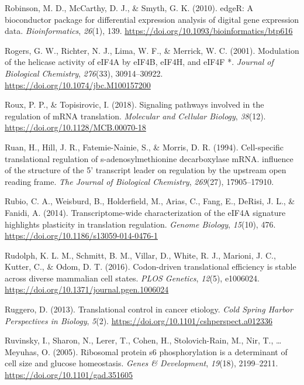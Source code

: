 \documentclass[12pt,openany]{book}
\begin{document}
\hypertarget{ref-Robinson2010}{}
Robinson, M. D., McCarthy, D. J., \& Smyth, G. K. (2010). edgeR: A
bioconductor package for differential expression analysis of digital
gene expression data. \emph{Bioinformatics}, \emph{26}(1), 139.
\url{https://doi.org/10.1093/bioinformatics/btp616}

\hypertarget{ref-Rogers2001}{}
Rogers, G. W., Richter, N. J., Lima, W. F., \& Merrick, W. C. (2001).
Modulation of the helicase activity of eIF4A by eIF4B, eIF4H, and eIF4F
*. \emph{Journal of Biological Chemistry}, \emph{276}(33), 30914--30922.
\url{https://doi.org/10.1074/jbc.M100157200}

\hypertarget{ref-Roux2018}{}
Roux, P. P., \& Topisirovic, I. (2018). Signaling pathways involved in
the regulation of mRNA translation. \emph{Molecular and Cellular
Biology}, \emph{38}(12). \url{https://doi.org/10.1128/MCB.00070-18}

\hypertarget{ref-Ruan1994}{}
Ruan, H., Hill, J. R., Fatemie-Nainie, S., \& Morris, D. R. (1994).
Cell-specific translational regulation of s-adenosylmethionine
decarboxylase mRNA. influence of the structure of the 5' transcript
leader on regulation by the upstream open reading frame. \emph{The
Journal of Biological Chemistry}, \emph{269}(27), 17905--17910.

\hypertarget{ref-Rubio2014}{}
Rubio, C. A., Weisburd, B., Holderfield, M., Arias, C., Fang, E.,
DeRisi, J. L., \& Fanidi, A. (2014). Transcriptome-wide characterization
of the eIF4A signature highlights plasticity in translation regulation.
\emph{Genome Biology}, \emph{15}(10), 476.
\url{https://doi.org/10.1186/s13059-014-0476-1}

\hypertarget{ref-Rudolph2016}{}
Rudolph, K. L. M., Schmitt, B. M., Villar, D., White, R. J., Marioni, J.
C., Kutter, C., \& Odom, D. T. (2016). Codon-driven translational
efficiency is stable across diverse mammalian cell states. \emph{PLOS
Genetics}, \emph{12}(5), e1006024.
\url{https://doi.org/10.1371/journal.pgen.1006024}

\hypertarget{ref-Ruggero2013}{}
Ruggero, D. (2013). Translational control in cancer etiology. \emph{Cold
Spring Harbor Perspectives in Biology}, \emph{5}(2).
\url{https://doi.org/10.1101/cshperspect.a012336}

\hypertarget{ref-Ruvinsky2005}{}
Ruvinsky, I., Sharon, N., Lerer, T., Cohen, H., Stolovich-Rain, M., Nir,
T., \ldots{} Meyuhas, O. (2005). Ribosomal protein s6 phosphorylation is
a determinant of cell size and glucose homeostasis. \emph{Genes \&
Development}, \emph{19}(18), 2199--2211.
\url{https://doi.org/10.1101/gad.351605}
\end{document}
